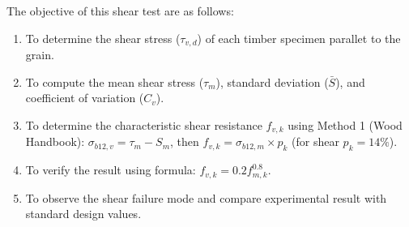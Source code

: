 \noindent The objective of this shear test are as follows:
\begin{enumerate}
    \item To determine the shear stress ($\tau_{v,d}$) of each timber specimen parallet to the grain.
    \item To compute the mean shear stress ($\tau_m$), standard deviation ($\bar{S}$), and coefficient of variation ($C_v$).
    \item To determine the characteristic shear resistance $f_{v,k}$ using Method 1 (Wood Handbook): $\sigma_{b12,v} = \tau_m - S_m $, then $  f_{v,k} = \sigma_{b12,m} \times p_k$ (for shear $p_k = 14 \%$).
    \item To verify the result using formula: $f_{v,k} = 0.2  f_{m,k}^{0.8}$.
    \item To observe the shear failure mode and compare experimental result with standard design values.
\end{enumerate}